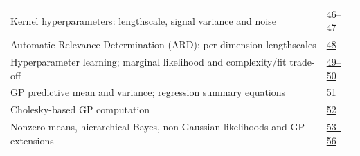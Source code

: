 \documentclass[10pt]{article}
\newcommand{\currenttopic}{Quick lookup}
\begin{document}
\begin{longtable}{@{}P{.79\linewidth}P{.17\linewidth}@{}}
Kernel hyperparameters: lengthscale, signal variance and noise & \href{../Lecture\%20Slides/1.3.\%20Bayesian\%20Learning.pdf\#page=46}{46--47}\\[3pt]
Automatic Relevance Determination (ARD); per-dimension lengthscales & \href{../Lecture\%20Slides/1.3.\%20Bayesian\%20Learning.pdf\#page=48}{48}\\[3pt]
Hyperparameter learning; marginal likelihood and complexity/fit trade-off & \href{../Lecture\%20Slides/1.3.\%20Bayesian\%20Learning.pdf\#page=49}{49--50}\\[3pt]
GP predictive mean and variance; regression summary equations & \href{../Lecture\%20Slides/1.3.\%20Bayesian\%20Learning.pdf\#page=51}{51}\\[3pt]
Cholesky-based GP computation & \href{../Lecture\%20Slides/1.3.\%20Bayesian\%20Learning.pdf\#page=52}{52}\\[3pt]
Nonzero means, hierarchical Bayes, non-Gaussian likelihoods and GP extensions & \href{../Lecture\%20Slides/1.3.\%20Bayesian\%20Learning.pdf\#page=53}{53--56}\\[3pt]
\bottomrule\end{longtable}

\clearpage\renewcommand{\currenttopic}{Topic 2}
\end{document}
